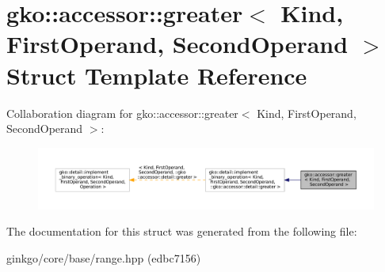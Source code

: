 \hypertarget{structgko_1_1accessor_1_1greater}{}\section{gko\+:\+:accessor\+:\+:greater$<$ Kind, First\+Operand, Second\+Operand $>$ Struct Template Reference}
\label{structgko_1_1accessor_1_1greater}


Collaboration diagram for gko\+:\+:accessor\+:\+:greater$<$ Kind, First\+Operand, Second\+Operand $>$\+:
\nopagebreak
\begin{figure}[H]
\begin{center}
\leavevmode
\includegraphics[width=350pt]{structgko_1_1accessor_1_1greater__coll__graph}
\end{center}
\end{figure}


The documentation for this struct was generated from the following file\+:\begin{DoxyCompactItemize}
\item 
ginkgo/core/base/range.\+hpp (edbc7156)\end{DoxyCompactItemize}
